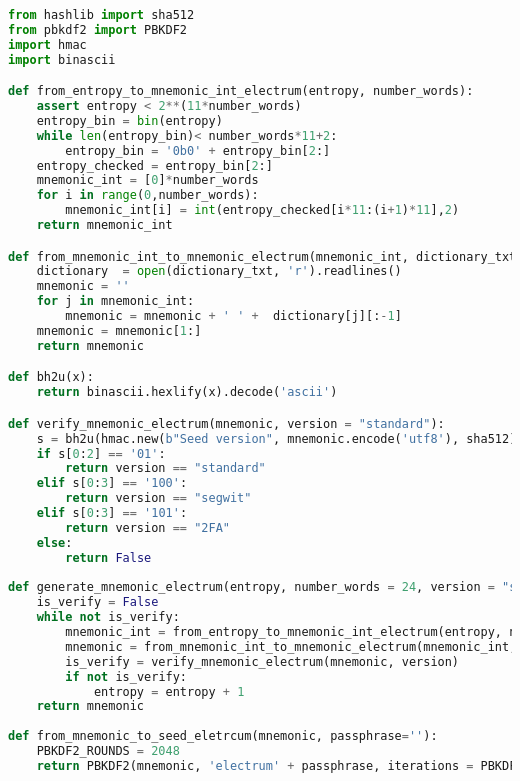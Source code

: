 \begin{lstlisting}[language=Python]
from hashlib import sha512
from pbkdf2 import PBKDF2
import hmac
import binascii

def from_entropy_to_mnemonic_int_electrum(entropy, number_words):
	assert entropy < 2**(11*number_words)
	entropy_bin = bin(entropy)
	while len(entropy_bin)< number_words*11+2:
		entropy_bin = '0b0' + entropy_bin[2:]
	entropy_checked = entropy_bin[2:]
	mnemonic_int = [0]*number_words
	for i in range(0,number_words):
		mnemonic_int[i] = int(entropy_checked[i*11:(i+1)*11],2)
	return mnemonic_int

def from_mnemonic_int_to_mnemonic_electrum(mnemonic_int, dictionary_txt):
	dictionary  = open(dictionary_txt, 'r').readlines()
	mnemonic = ''
	for j in mnemonic_int:
		mnemonic = mnemonic + ' ' +  dictionary[j][:-1]
	mnemonic = mnemonic[1:]
	return mnemonic

def bh2u(x):
	return binascii.hexlify(x).decode('ascii')

def verify_mnemonic_electrum(mnemonic, version = "standard"):
	s = bh2u(hmac.new(b"Seed version", mnemonic.encode('utf8'), sha512).digest()) 
	if s[0:2] == '01':
		return version == "standard"
	elif s[0:3] == '100':
		return version == "segwit"
	elif s[0:3] == '101':
		return version == "2FA"
	else:
		return False
		
def generate_mnemonic_electrum(entropy, number_words = 24, version = "standard", dictionary = 'English_dictionary.txt'):
	is_verify = False
	while not is_verify:
		mnemonic_int = from_entropy_to_mnemonic_int_electrum(entropy, number_words)
		mnemonic = from_mnemonic_int_to_mnemonic_electrum(mnemonic_int, dictionary)
		is_verify = verify_mnemonic_electrum(mnemonic, version)
		if not is_verify:
			entropy = entropy + 1
	return mnemonic
	
def from_mnemonic_to_seed_eletrcum(mnemonic, passphrase=''):
	PBKDF2_ROUNDS = 2048
	return PBKDF2(mnemonic, 'electrum' + passphrase, iterations = PBKDF2_ROUNDS, macmodule = hmac, digestmodule = sha512).read(64).hex()
\end{lstlisting}

